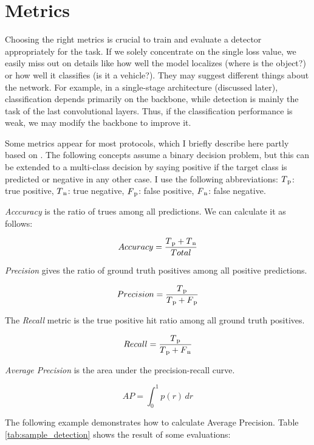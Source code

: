\section{Metrics}

Choosing the right metrics is crucial to train and evaluate a detector appropriately for the task. If we solely concentrate on the single loss value, we easily miss out on details like how well the model localizes (where is the object?) or how well it classifies (is it a vehicle?). They may suggest different things about the network. For example, in a single-stage architecture (discussed later), classification depends primarily on the backbone, while detection is mainly the task of the last convolutional layers. Thus, if the classification performance is weak, we may modify the backbone to improve it.

Some metrics appear for most protocols, which I briefly describe here partly based on \cite{mAP}. The following concepts assume a binary decision problem, but this can be extended to a multi-class decision by saying positive if the target class is predicted or negative in any other case. I use the following abbreviations: \(T\textsubscript{p}\): true positive, \(T\textsubscript{n}\): true negative, \(F\textsubscript{p}\): false positive, \(F\textsubscript{n}\): false negative.

\textit{Acccuracy} is the ratio of trues among all predictions. We can calculate it as follows:

\[Accuracy=\frac{T\textsubscript{p}+T\textsubscript{n}}{Total}\]

\textit{Precision} gives the ratio of ground truth positives among all positive predictions.

\[Precision=\frac{T\textsubscript{p}}{T\textsubscript{p}+F\textsubscript{p}}\]

The \textit{Recall} metric is the true positive hit ratio among all ground truth positives.

\[Recall=\frac{T\textsubscript{p}}{T\textsubscript{p}+F\textsubscript{n}}\]

\textit{Average Precision} is the area under the precision-recall curve.

\[AP=\int_{0}^{1} p(r)\,dr \]

The following example demonstrates how to calculate Average Precision. Table \ref{tab:sample_detection} shows the result of some evaluations:

